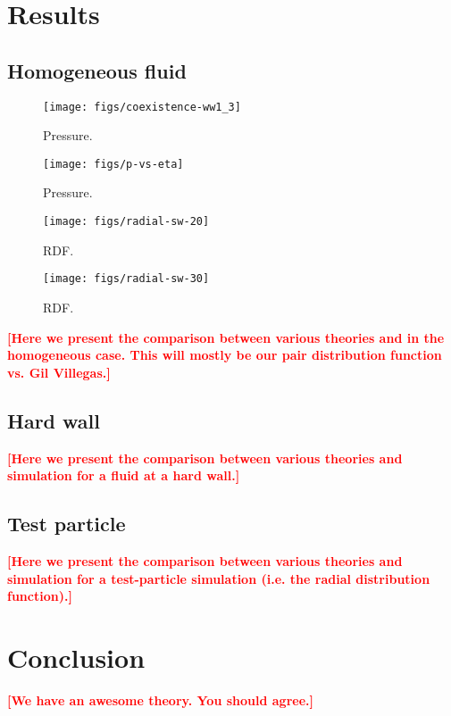 \documentclass[letterpaper,twocolumn,amsmath,amssymb,pre,aps,10pt]{revtex4-1}
\newcommand\fixme[1]{\textcolor{red}{\textbf{[#1]}}}
\begin{document}
\section{Results}

\subsection{Homogeneous fluid}

\begin{figure}
\begin{center}
\texttt{[image: figs/coexistence-ww1\_3]}
\end{center}
\caption{Pressure.}
\label{fig:coexistencec}
\end{figure}

\begin{figure}
\begin{center}
\texttt{[image: figs/p-vs-eta]}
\end{center}
\caption{Pressure.}
\label{fig:p-vs-eta}
\end{figure}


\begin{figure}[h]
\begin{center}
\texttt{[image: figs/radial-sw-20]}
\end{center}
\caption{RDF.}
\label{fig:homogeneous-20}
\end{figure}

\begin{figure}[h]
\begin{center}
\texttt{[image: figs/radial-sw-30]}
\end{center}
\caption{RDF.}
\label{fig:homogeneous-30}
\end{figure}

\fixme{Here we present the comparison between various theories and in
  the homogeneous case.  This will mostly be our pair distribution
  function vs. Gil Villegas.}

\subsection{Hard wall}

\fixme{Here we present the comparison between various theories and
  simulation for a fluid at a hard wall.}

\subsection{Test particle}

\fixme{Here we present the comparison between various theories and
  simulation for a test-particle simulation (i.e. the radial
  distribution function).}

\section{Conclusion}

\fixme{We have an awesome theory. You should agree.}

\end{document}
